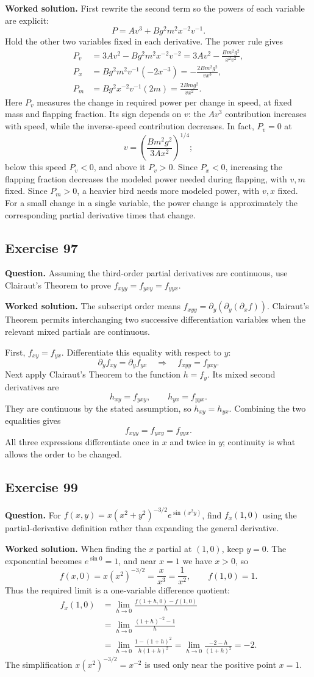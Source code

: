 \documentclass[11pt]{article}
\newcommand{\ex}[1]{\Needspace{8\baselineskip}\subsection*{Exercise #1}}
\newcommand{\ans}[1]{\boxed{#1}}
\begin{document}
\textbf{Worked solution.}
First rewrite the second term so the powers of each variable are explicit:
\[P=Av^3+Bg^2m^2x^{-2}v^{-1}.\]
Hold the other two variables fixed in each derivative. The power rule gives
\begin{align*}
P_v&=3Av^2-Bg^2m^2x^{-2}v^{-2}
     =\ans{3Av^2-\frac{Bm^2g^2}{x^2v^2}},\\
P_x&=Bg^2m^2v^{-1}(-2x^{-3})
     =\ans{-\frac{2Bm^2g^2}{vx^3}},\\
P_m&=Bg^2x^{-2}v^{-1}(2m)
     =\ans{\frac{2Bmg^2}{vx^2}}.
\end{align*}
Here $P_v$ measures the change in required power per change in speed, at fixed mass and flapping fraction. Its sign depends on $v$: the $Av^3$ contribution increases with speed, while the inverse-speed contribution decreases. In fact, $P_v=0$ at
\[v=\left(\frac{Bm^2g^2}{3Ax^2}\right)^{1/4};\]
below this speed $P_v<0$, and above it $P_v>0$.
Since $P_x<0$, increasing the flapping fraction decreases the modeled power needed during flapping, with $v,m$ fixed. Since $P_m>0$, a heavier bird needs more modeled power, with $v,x$ fixed. For a small change in a single variable, the power change is approximately the corresponding partial derivative times that change.

\ex{97}
\textbf{Question.} Assuming the third-order partial derivatives are continuous, use Clairaut's Theorem to prove $f_{xyy}=f_{yxy}=f_{yyx}$.

\textbf{Worked solution.}
The subscript order means $f_{xyy}=\partial_y(\partial_y(\partial_x f))$. Clairaut's Theorem permits interchanging two successive differentiation variables when the relevant mixed partials are continuous.

First, $f_{xy}=f_{yx}$. Differentiate this equality with respect to $y$:
\[\partial_y f_{xy}=\partial_y f_{yx}
\quad\Longrightarrow\quad f_{xyy}=f_{yxy}.\]
Next apply Clairaut's Theorem to the function $h=f_y$. Its mixed second derivatives are
\[h_{xy}=f_{yxy},\qquad h_{yx}=f_{yyx}.\]
They are continuous by the stated assumption, so $h_{xy}=h_{yx}$. Combining the two equalities gives
\[\ans{f_{xyy}=f_{yxy}=f_{yyx}}.\]
All three expressions differentiate once in $x$ and twice in $y$; continuity is what allows the order to be changed.

\ex{99}
\textbf{Question.} For $f(x,y)=x(x^2+y^2)^{-3/2}e^{\sin(x^2y)}$, find $f_x(1,0)$ using the partial-derivative definition rather than expanding the general derivative.

\textbf{Worked solution.}
When finding the $x$ partial at $(1,0)$, keep $y=0$. The exponential becomes $e^{\sin0}=1$, and near $x=1$ we have $x>0$, so
\[f(x,0)=x(x^2)^{-3/2}=\frac{x}{x^3}=\frac1{x^2},
\qquad f(1,0)=1.\]
Thus the required limit is a one-variable difference quotient:
\begin{align*}
f_x(1,0)
&=\lim_{h\to0}\frac{f(1+h,0)-f(1,0)}{h}\\
&=\lim_{h\to0}\frac{(1+h)^{-2}-1}{h}\\
&=\lim_{h\to0}\frac{1-(1+h)^2}{h(1+h)^2}
=\lim_{h\to0}\frac{-2-h}{(1+h)^2}
=\ans{-2}.
\end{align*}
The simplification $x(x^2)^{-3/2}=x^{-2}$ is used only near the positive point $x=1$.
\end{document}
